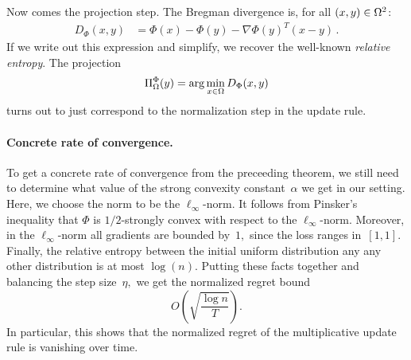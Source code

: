 Now comes the projection step. The Bregman divergence is, for all $(x,y)\in\Omega^2$:
\begin{align*}
    D_{\Phi}(x,y) &= \Phi(x)-\Phi(y) - \nabla\Phi(y)^T(x-y)\,.
\end{align*}
If we write out this expression and simplify, we recover the well-known
\emph{relative entropy}. The projection
\begin{align*}
    \Pi_{\Omega}^{\Phi}(y) = \arg\min_{x\in\Omega}D_{\Phi}(x,y)
\end{align*}
turns out to just correspond to the normalization step in the update rule.

\paragraph{Concrete rate of convergence.}
To get a concrete rate of convergence from the preceeding theorem,
we still need to determine what value of the strong convexity
constant~$\alpha$ we get in our setting. Here, we choose the norm to be the
$\ell_\infty$-norm. It follows from Pinsker's inequality
that $\Phi$ is $1/2$-strongly convex with respect to the $\ell_\infty$-norm.
Moreover, in the $\ell_\infty$-norm all gradients are bounded by~$1,$ since the
loss ranges in~$[1,1].$ Finally, the relative entropy between the initial
uniform distribution any any other distribution is at most $\log(n).$ Putting
these facts together and balancing the step size~$\eta,$ we get the normalized 
regret bound
\[
O\left(\sqrt{\frac{\log n}{T}}\right).
\]
In particular, this shows that the normalized regret of the multiplicative
update rule is vanishing over time.
